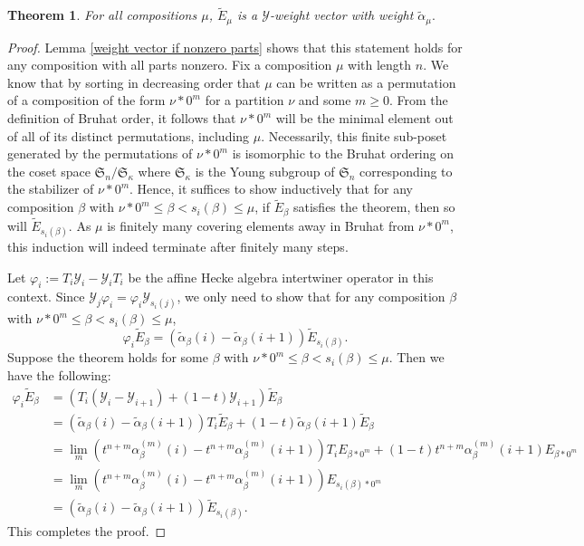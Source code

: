 \documentclass[11pt]{article}
\newtheorem{thm}[theo]{Theorem}
\theoremstyle{definition}
\numberwithin{equation}{section}
\newcommand{\y}{{ \mathscr{Y} }}
\begin{document}
\begin{thm} \label{weight vector for all}
For all compositions $\mu$, $\widetilde{E}_{\mu}$ is a $\y$-weight vector with weight $\widetilde{\alpha}_{\mu}.$
\end{thm}

\begin{proof}
 Lemma \ref{weight vector if nonzero parts} shows that this statement holds for any composition with all parts nonzero. Fix a composition $\mu$ with length $n$. We know that by sorting in decreasing order that $\mu$ can be written as a permutation of a composition of the form $\nu * 0^m$ for a partition $\nu$ and some $m \geq 0$. From the definition of Bruhat order, it follows that $\nu*0^m$ will be the minimal element out of all of its distinct permutations, including $\mu$. Necessarily, this finite sub-poset generated by the permutations of $\nu*0^m$ is isomorphic to the Bruhat ordering on the coset space $\mathfrak{S}_n/\mathfrak{S}_{\kappa}$ where $\mathfrak{S}_{\kappa}$ is the Young subgroup of $\mathfrak{S}_n$ corresponding to the stabilizer of $\nu*0^m$. Hence, it suffices to show inductively that for any composition $\beta$ with $\nu*0^m \leq \beta < s_i(\beta) \leq \mu$, if $\widetilde{E}_{\beta}$ satisfies the theorem, then so will $\widetilde{E}_{s_i(\beta)}$. As $\mu$ is finitely many covering elements away in Bruhat from $\nu*0^m$, this induction will indeed terminate after finitely many steps.
 
Let $\varphi_i := T_i\y_i-\y_iT_i$ be the affine Hecke algebra intertwiner operator in this context. Since $\y_j\varphi_i = \varphi_i \y_{s_i(j)}$, we only need to show that for any composition $\beta$ with $\nu*0^m \leq \beta < s_i(\beta) \leq \mu$, $$\varphi_i \widetilde{E}_{\beta} = (\widetilde{\alpha}_{\beta}(i) - \widetilde{\alpha}_{\beta}(i+1))\widetilde{E}_{s_i(\beta)}.$$ Suppose the theorem holds for some $\beta$ with $\nu*0^m \leq \beta < s_i(\beta) \leq \mu$. Then we have the following:
\begin{align*}
    \varphi_{i}\widetilde{E}_{\beta} &= (T_i(\y_i - \y_{i+1}) + (1-t)\y_{i+1})\widetilde{E}_{\beta} \\
    &= (\widetilde{\alpha}_{\beta}(i)- \widetilde{\alpha}_{\beta}(i+1))T_i\widetilde{E}_{\beta} + (1-t)\widetilde{\alpha}_{\beta}(i+1)\widetilde{E}_{\beta} \\
    &= \lim_{m} (t^{n+m}\alpha_{\beta}^{(m)}(i)- t^{n+m}\alpha_{\beta}^{(m)}(i+1))T_iE_{\beta *0^m} + (1-t)t^{n+m}\alpha_{\beta}^{(m)}(i+1)E_{\beta *0^m} \\
    &= \lim_{m}(t^{n+m}\alpha_{\beta}^{(m)}(i)- t^{n+m}\alpha_{\beta}^{(m)}(i+1))E_{s_i(\beta) *0^m}\\
    &= (\widetilde{\alpha}_{\beta}(i) - \widetilde{\alpha}_{\beta}(i+1))\widetilde{E}_{s_i(\beta)}.
\end{align*}
This completes the proof.
\end{proof}
\end{document}
